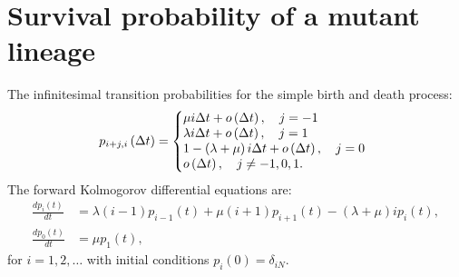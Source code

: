 \documentclass[11pt,a4paper]{article}
\begin{document}
\section{Survival probability of a mutant lineage}\label{AppendixSurvLin}
The infinitesimal transition probabilities for the simple birth and death process:
\begin{align*}
p_{i+j,i}\left(\Delta t\right)=\left\{
  \begin{array}{@{}ll@{}}
  \mu i\Delta t+o\left(\Delta t\right),\quad j=-1 \\
  \lambda i\Delta t+o\left(\Delta t\right),\quad j=1 \\
    1-\left(\lambda+\mu\right) i\Delta t+o\left(\Delta t\right),\quad j=0 \\
   o\left(\Delta t\right),\quad j\neq-1,0,1.
  \end{array}\right.
\end{align*}
The forward Kolmogorov differential equations are:
\begin{subequations}
\label{KolmeqSurv}
\begin{flalign}
\frac{dp_i\left(t\right)}{dt}&=\lambda\left(i-1\right)p_{i-1}\left(t\right)+\mu\left(i+1\right)p_{i+1}\left(t\right)-\left(\lambda+\mu\right)ip_i\left(t\right),\\
\frac{dp_0\left(t\right)}{dt}&=\mu p_1\left(t\right),
\end{flalign}
\end{subequations}
for $i=1,2,\dots$ with initial conditions $p_i\left(0\right)=\delta_{iN}$.
\end{document}
